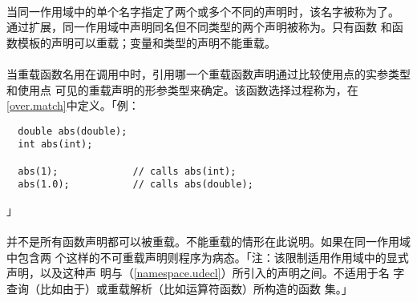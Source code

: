 
\paragraph{}
当同一作用域中的单个名字指定了两个或多个不同的声明时，该名字被称为了。
通过扩展，同一作用域中声明同名但不同类型的两个声明被称为。只有函数
和函数模板的声明可以重载；变量和类型的声明不能重载。

\paragraph{}
当重载函数名用在调用中时，引用哪一个重载函数声明通过比较使用点的实参类型和使用点
可见的重载声明的形参类型来确定。该函数选择过程称为，在
\ref{over.match}中定义。「例：
\begin{lstlisting}
  double abs(double);
  int abs(int);

  abs(1);             // calls abs(int);
  abs(1.0);           // calls abs(double);
\end{lstlisting}」

\paragraph{}
并不是所有函数声明都可以被重载。不能重载的情形在此说明。如果在同一作用域中包含两
个这样的不可重载声明则程序为病态。「注：该限制适用作用域中的显式声明，以及这种声
明与（\ref{namespace.udecl}）所引入的声明之间。不适用于名
字查询（比如由于）或重载解析（比如运算符函数）所构造的函数
集。」

